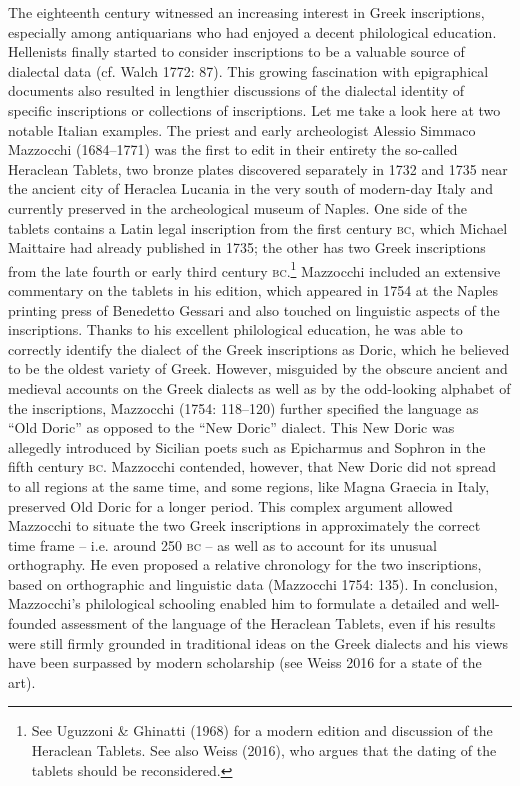 \documentclass[12pt]{article}
\newenvironment{styleStandard}{\renewcommand\baselinestretch{1.25}\setlength\leftskip{0in}\setlength\rightskip{0in}\setlength\parindent{0.1972in}\setlength\parfillskip{0pt plus 1fil}\setlength\parskip{0in plus 1pt}\writerlistparindent\writerlistleftskip\leavevmode\normalfont\normalsize\writerlistlabel\ignorespaces}{\unskip\vspace{0in plus 1pt}\par}
\newcommand\writerlistleftskip{}
\newcommand\writerlistparindent{}
\newcommand\writerlistlabel{}
\begin{document}
\begin{styleStandard}
The eighteenth century witnessed an increasing interest in Greek inscriptions, especially among antiquarians who had enjoyed a decent philological education. Hellenists finally started to consider inscriptions to be a valuable source of dialectal data (cf. Walch 1772: 87). This growing fascination with epigraphical documents also resulted in lengthier discussions of the dialectal identity of specific inscriptions or collections of inscriptions. Let me take a look here at two notable Italian examples. The priest and early archeologist Alessio Simmaco Mazzocchi (1684–1771) was the first to edit in their entirety the so-called Heraclean Tablets, two bronze plates discovered separately in 1732 and 1735 near the ancient city of Heraclea Lucania in the very south of modern-day Italy and currently preserved in the archeological museum of Naples. One side of the tablets contains a Latin legal inscription from the first century \textsc{bc}, which Michael Maittaire had already published in 1735; the other has two Greek inscriptions from the late fourth or early third century \textsc{bc}.\footnote{ See Uguzzoni \& Ghinatti (1968) for a modern edition and discussion of the Heraclean Tablets. See also Weiss (2016), who argues that the dating of the tablets should be reconsidered.} Mazzocchi included an extensive commentary on the tablets in his edition, which appeared in 1754 at the Naples printing press of Benedetto Gessari and also touched on linguistic aspects of the inscriptions. Thanks to his excellent philological education, he was able to correctly identify the dialect of the Greek inscriptions as Doric, which he believed to be the oldest variety of Greek. However, misguided by the obscure ancient and medieval accounts on the Greek dialects as well as by the odd-looking alphabet of the inscriptions, Mazzocchi (1754: 118–120) further specified the language as “Old Doric” as opposed to the “New Doric” dialect. This New Doric was allegedly introduced by Sicilian poets such as Epicharmus and Sophron in the fifth century \textsc{bc}. Mazzocchi contended, however, that New Doric did not spread to all regions at the same time, and some regions, like Magna Graecia in Italy, preserved Old Doric for a longer period. This complex argument allowed Mazzocchi to situate the two Greek inscriptions in approximately the correct time frame – i.e. around 250 \textsc{bc} – as well as to account for its unusual orthography. He even proposed a relative chronology for the two inscriptions, based on orthographic and linguistic data (Mazzocchi 1754: 135). In conclusion, Mazzocchi’s philological schooling enabled him to formulate a detailed and well-founded assessment of the language of the Heraclean Tablets, even if his results were still firmly grounded in traditional ideas on the Greek dialects and his views have been surpassed by modern scholarship (see Weiss 2016 for a state of the art).
\end{styleStandard}
\end{document}
